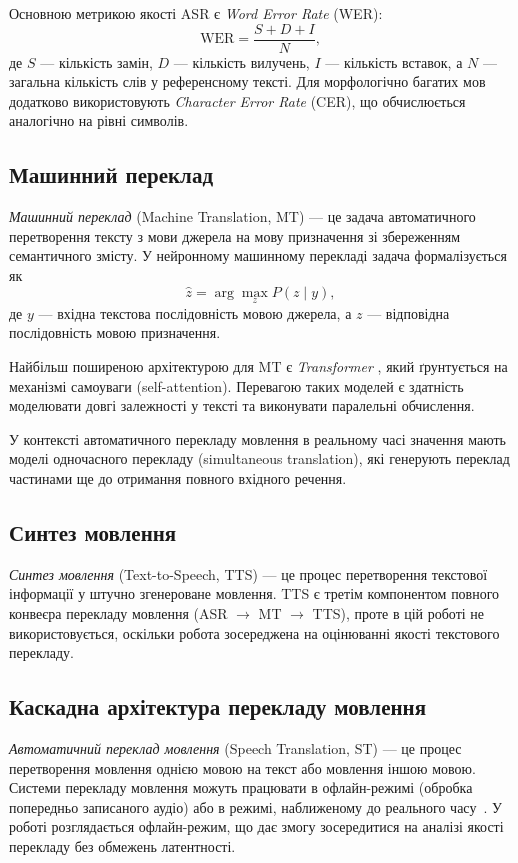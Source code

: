 Основною метрикою якості ASR є \textit{Word Error Rate} (WER):
\[
\text{WER} = \frac{S + D + I}{N},
\]
де $S$ --- кількість замін, $D$ --- кількість вилучень, $I$ --- кількість вставок,
а $N$ --- загальна кількість слів у референсному тексті. Для морфологічно багатих
мов додатково використовують \textit{Character Error Rate} (CER), що обчислюється
аналогічно на рівні символів.

\subsection{Машинний переклад}

\textit{Машинний переклад} (Machine Translation, MT) --- це задача автоматичного
перетворення тексту з мови джерела на мову призначення зі збереженням
семантичного змісту. У нейронному машинному перекладі задача формалізується як
\[
\hat{z} = \arg\max_{z} P(z \mid y),
\]
де $y$ --- вхідна текстова послідовність мовою джерела, а $z$ --- відповідна
послідовність мовою призначення.

Найбільш поширеною архітектурою для MT є \textit{Transformer} \cite{vaswani}, який
ґрунтується на механізмі самоуваги (self-attention). Перевагою таких моделей є
здатність моделювати довгі залежності у тексті та виконувати паралельні
обчислення.

У контексті автоматичного перекладу мовлення в реальному часі значення мають
моделі одночасного перекладу (simultaneous translation), які генерують переклад
частинами ще до отримання повного вхідного речення.

\subsection{Синтез мовлення}

\textit{Синтез мовлення} (Text-to-Speech, TTS) --- це процес перетворення текстової
інформації у штучно згенероване мовлення. TTS є третім компонентом повного
конвеєра перекладу мовлення (ASR $\to$ MT $\to$ TTS), проте в цій роботі
не використовується, оскільки робота зосереджена на оцінюванні
якості текстового перекладу.

\subsection{Каскадна архітектура перекладу мовлення}
\label{subsec:cascade}

\textit{Автоматичний переклад мовлення} (Speech Translation, ST) --- це процес
перетворення мовлення однією мовою на текст або мовлення іншою мовою.
Системи перекладу мовлення можуть працювати в офлайн-режимі (обробка
попередньо записаного аудіо) або в режимі, наближеному до реального
часу~\cite{real_time}. У роботі розглядається офлайн-режим,
що дає змогу зосередитися на аналізі якості перекладу без обмежень
латентності.

